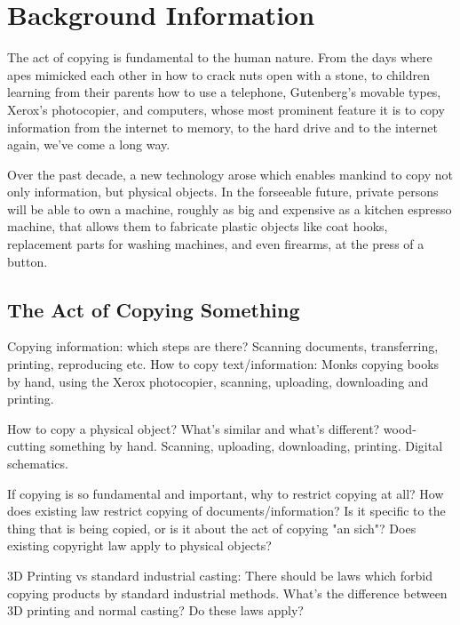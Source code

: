 \section{Background Information}

The act of copying is fundamental to the human nature.  From the days where apes
mimicked each other in how to crack nuts open with a stone, to children
learning from their parents how to use a telephone, Gutenberg's movable types,
Xerox's photocopier, and computers, whose most prominent feature it is to copy
information from the internet to memory, to the hard drive and to the internet
again, we've come a long way.

Over the past decade, a new technology arose which enables mankind to copy not
only information, but physical objects.  In the forseeable future, private
persons will be able to own a machine, roughly as big and expensive as a
kitchen espresso machine, that allows them to fabricate plastic objects like
coat hooks, replacement parts for washing machines, and even firearms, at the
press of a button.

\subsection{The Act of Copying Something}

Copying information: which steps are there?  Scanning documents, transferring,
printing, reproducing etc.  How to copy text/information: Monks copying books
by hand, using the Xerox photocopier, scanning, uploading, downloading and
printing.

How to copy a physical object?  What's similar and what's different?
wood-cutting something by hand.  Scanning, uploading, downloading, printing.
Digital schematics.

If copying is so fundamental and important, why to restrict copying at all?
How does existing law restrict copying of documents/information?  Is it
specific to the thing that is being copied, or is it about the act of copying
"an sich"?  Does existing copyright law apply to physical objects?

3D Printing vs standard industrial casting: There should be laws which forbid
copying products by standard industrial methods.  What's the difference between
3D printing and normal casting?  Do these laws apply?

